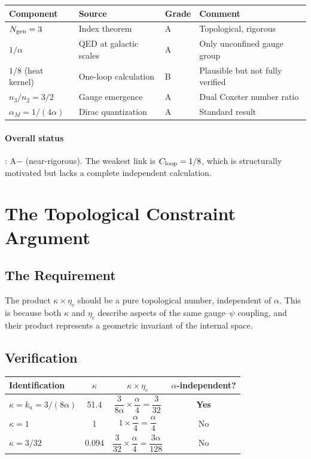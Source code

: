 \documentclass[12pt,a4paper]{article}
\theoremstyle{remark}
\begin{document}
\begin{center}
\begin{tabular}{llll}
\toprule
Component & Source & Grade & Comment \\
\midrule
$N_{\rm gen} = 3$ & Index theorem & A & Topological, rigorous \\
$1/\alpha$ & QED at galactic scales & A & Only unconfined gauge group \\
$1/8$ (heat kernel) & One-loop calculation & B & Plausible but not fully verified \\
$n_3/n_2 = 3/2$ & Gauge emergence & A & Dual Coxeter number ratio \\
$\alpha_M = 1/(4\alpha)$ & Dirac quantization & A & Standard result \\
\bottomrule
\end{tabular}
\end{center}

\paragraph{Overall status}: A$-$ (near-rigorous). The weakest link is
$C_{\rm loop} = 1/8$, which is structurally motivated but lacks a complete
independent calculation.

\section{The Topological Constraint Argument}

\subsection{The Requirement}

The product $\kappa \times \eta_c$ should be a pure topological number,
independent of $\alpha$. This is because both $\kappa$ and $\eta_c$ describe
aspects of the same gauge--$\psi$ coupling, and their product represents a
geometric invariant of the internal space.

\subsection{Verification}

\begin{center}
\begin{tabular}{lccc}
\toprule
Identification & $\kappa$ & $\kappa \times \eta_c$ & $\alpha$-independent? \\
\midrule
$\kappa = k_a = 3/(8\alpha)$ & 51.4 & $\dfrac{3}{8\alpha} \times \dfrac{\alpha}{4} = \dfrac{3}{32}$ & \textbf{Yes} \\[10pt]
$\kappa = 1$ & 1 & $1 \times \dfrac{\alpha}{4} = \dfrac{\alpha}{4}$ & No \\[10pt]
$\kappa = 3/32$ & 0.094 & $\dfrac{3}{32} \times \dfrac{\alpha}{4} = \dfrac{3\alpha}{128}$ & No \\
\bottomrule
\end{tabular}
\end{center}
\end{document}
